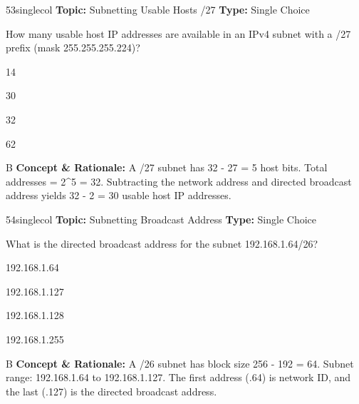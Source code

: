 \begin{qcard}{53}{singlecol}
\textcolor{darkslate!75}{\small\textbf{Topic:} Subnetting Usable Hosts /27 \hfill \textbf{Type:} Single Choice}\vspace{0.4em}\par
How many usable host IP addresses are available in an IPv4 subnet with a /27 prefix (mask 255.255.255.224)?
\begin{qoptions}
\item 14
\item 30
\item 32
\item 62
\end{qoptions}
\end{qcard}
\nopagebreak
\begin{explainbox}{B}
\textbf{Concept \& Rationale:} A /27 subnet has 32 - 27 = 5 host bits. Total addresses = 2\textasciicircum{}5 = 32. Subtracting the network address and directed broadcast address yields 32 - 2 = 30 usable host IP addresses.
\end{explainbox}

\begin{qcard}{54}{singlecol}
\textcolor{darkslate!75}{\small\textbf{Topic:} Subnetting Broadcast Address \hfill \textbf{Type:} Single Choice}\vspace{0.4em}\par
What is the directed broadcast address for the subnet 192.168.1.64/26?
\begin{qoptions}
\item 192.168.1.64
\item 192.168.1.127
\item 192.168.1.128
\item 192.168.1.255
\end{qoptions}
\end{qcard}
\nopagebreak
\begin{explainbox}{B}
\textbf{Concept \& Rationale:} A /26 subnet has block size 256 - 192 = 64. Subnet range: 192.168.1.64 to 192.168.1.127. The first address (.64) is network ID, and the last (.127) is the directed broadcast address.
\end{explainbox}

